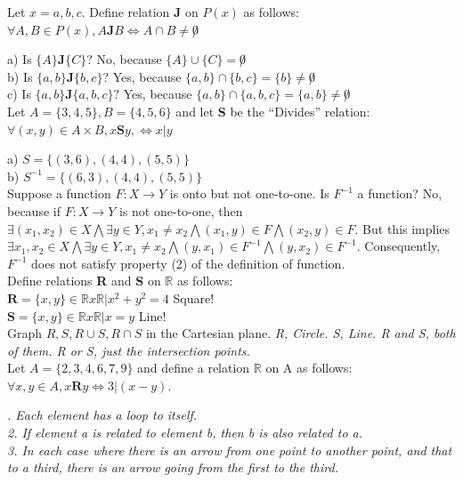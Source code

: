 \documentclass[12pt]{minimal}
\begin{document}
Let $x = {a,b,c}$. Define relation \textbf{J} on $P(x)$ as follows: $\forall A,B \in P(x), A \textbf{J} B \Leftrightarrow A \cap B \not = \not 0$ \tabularnewline

\noindent
a) Is $\{A\} \textbf{J} \{C\}$? No, because $\{A\} \cup \{C\} = \not 0$ \\
b) Is $\{a,b\} \textbf{J} \{b,c\}$? Yes, because $\{a,b\} \cap \{b,c\} = \{b\} \not = \not 0$\\
c) Is $\{a,b\} \textbf{J} \{a,b,c\}?$ Yes, because $\{a,b\} \cap \{a,b,c\} = \{a,b\} \not = \not 0$\\

Let $A = \{3,4,5\}, B = \{4,5,6\}$ and let \textbf{S} be the ``Divides'' relation: $\forall (x,y) \in A \times B, x \textbf{S} y, \Leftrightarrow x | y$\tabularnewline

\noindent
a) $S = \{(3,6),(4,4),(5,5)\}$ \\
b) $ S^{-1} = \{(6,3),(4,4),(5,5)\}$ \\


Suppose a function $F: X \rightarrow Y$ is onto but not one-to-one. Is $F^{-1}$ a function? \tabularnewline
No, because if $F: X \rightarrow Y$ is not one-to-one, then $\exists (x_1, x_2) \in X \bigwedge \exists y \in Y, x_1 \neq x_2 \bigwedge (x_1,y) \in F \bigwedge (x_2,y) \in F$. But this implies $\exists x_1, x_2 \in X \bigwedge \exists y \in Y, x_1 \neq x_2 \bigwedge (y,x_1) \in F^{-1} \bigwedge (y, x_2) \in F^{-1}.$ Consequently, $F^{-1}$ does not satisfy property (2) of the definition of function. \\

Define relations \textbf{R} and \textbf{S} on $\mathbb{R}$ as follows: \\
$\textbf{R} = \{x,y\} \in \mathbb{R} x \mathbb{R} | x^2 + y^2 = 4 $ Square! \\
$\textbf{S} = \{x,y\} \in \mathbb{R} x \mathbb{R} | x = y $ Line! \\
Graph $R, S, R \cup S, R \cap S$ in the Cartesian plane. \textit{R, Circle. S, Line. R and S, both of them. R or S, just the intersection points.} \\

Let $A = \{2, 3, 4, 6, 7, 9\} $ and define a relation $\mathbb{R}$ on A as follows: $\forall x,y \in A, x \textbf{R} y \Leftrightarrow 3 | (x - y)$.

\textit{
. Each element has a loop to itself. \\
2. If element a is related to element b, then b is also related to a.\\
3. In each case where there is an arrow from one point to another point, and that to a third, there is an arrow going from the first to the third.\\
}
\end{document}
